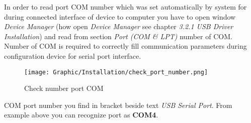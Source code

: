 	In order to read port COM number which was set automatically by system for \deviceName during connected interface of device to computer you have to open window \textit{Device Manager} (how open \textit{Device Manager} see chapter \textit{3.2.1 USB Driver Installation}) and read from section \textit{Port (COM \& LPT)} number of COM. Number of COM is required to correctly fill communication parameters during configuration device for serial port interface.

	\begin{figure}[!h] 
	\centering \texttt{[image: Graphic/Installation/check\_port\_number.png]}	
	\caption{Check number port COM}
	\label{check_number_port_COM}
	\end{figure}
	\FloatBarrier

COM port number you find in bracket beside text \textit{USB Serial Port}. From example above you can recognize port as \textbf{COM4}.